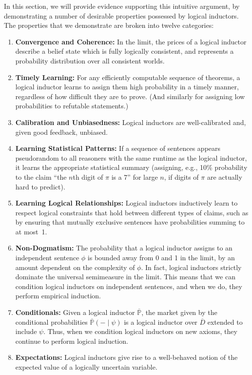 \documentclass[authordate,onecolumn,noenvironments]{miri-tech-article}
\numberwithin{equation}{subsection}
\newcommand{\seq}[1]{{\overline{#1}}}
\newcommand{\any}{-}
\newcommand{\BelState}{\mathbb{P}}
\newcommand{\pt}{\BelState}
\newcommand{\MP}{\seq{\pt}}
\newcommand{\dt}{D}
\newcommand{\DP}{\seq{\dt}}
\begin{document}
\noindent In this section, we will provide evidence supporting this intuitive argument, by demonstrating a number of desirable properties possessed by logical inductors. The properties that we demonstrate are broken into twelve categories:

\begin{enumerate}
  \item \textbf{Convergence and Coherence:} In the limit, the prices of a logical inductor describe a belief state which is fully logically consistent, and represents a probability distribution over all consistent worlds.
  \item \textbf{Timely Learning:} For any efficiently computable sequence of theorems, a logical inductor learns to assign them high probability in a timely manner, regardless of how difficult they are to prove. (And similarly for assigning low probabilities to refutable statements.)
  \item \textbf{Calibration and Unbiasedness:} Logical inductors are well-calibrated and, given good feedback, unbiased.
  \item \textbf{Learning Statistical Patterns:} If a sequence of sentences appears pseudorandom to all reasoners with the same runtime as the logical inductor, it learns the appropriate statistical summary (assigning, e.g., 10\% probability to the claim ``the $n$th digit of $\pi$ is a 7'' for large $n$, if digits of $\pi$ are actually hard to predict).
  \item \textbf{Learning Logical Relationships:} Logical inductors inductively learn to respect logical constraints that hold between different types of claims, such as by ensuring that mutually exclusive sentences have probabilities summing to at most~1.
  \item \textbf{Non-Dogmatism:} The probability that a logical inductor assigns to an independent sentence $\phi$ is bounded away from 0 and 1 in the limit, by an amount dependent on the complexity of $\phi$. In fact, logical inductors strictly dominate the universal semimeasure in the limit. This means that we can condition logical inductors on independent sentences, and when we do, they perform empirical induction.
  \item \textbf{Conditionals:} Given a logical inductor $\MP$, the market given by the conditional probabilities $\MP(\any\mid\psi)$ is a logical inductor over $\DP$ extended to include $\psi$. Thus, when we condition logical inductors on new axioms, they continue to perform logical induction.
  \item \textbf{Expectations:} Logical inductors give rise to a well-behaved notion of the expected value of a logically uncertain variable.

\end{enumerate}
\end{document}
